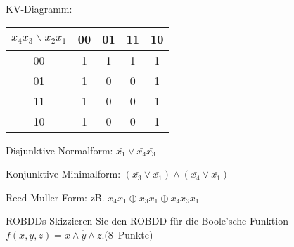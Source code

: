 \documentclass{exercisesheet}
\begin{document}
\begin{solutions}
  \item KV-Diagramm:
  \begin{tabular}{c|cccc}
    $x_4x_3\backslash x_2x_1$ & 00 & 01 & 11 & 10 \\
    \hline
    00                        & 1  & 1  & 1  & 1  \\
    01                        & 1  & 0  & 0  & 1  \\
    11                        & 1  & 0  & 0  & 1  \\
    10                        & 1  & 0  & 0  & 1  \\
  \end{tabular}\par
  Disjunktive Normalform: $\bar{x_1}\lor\bar{x_4}\bar{x_3}$
  \item Konjunktive Minimalform: $(\bar{x_3}\lor\bar{x_1})\land(\bar{x_4}\lor\bar{x_1})$
  \item Reed-Muller-Form: zB. $x_4x_1\oplus x_3x_1\oplus x_4x_3x_1$
\end{solutions}

\begin{exercise}{ROBDDs}
  Skizzieren Sie den ROBDD für die Boole’sche Funktion $f (x, y, z) = \overline{x \land y \land z}$.\hfill (8~Punkte)

  \begin{solution}
  \end{solution}
\end{exercise}
\end{document}
